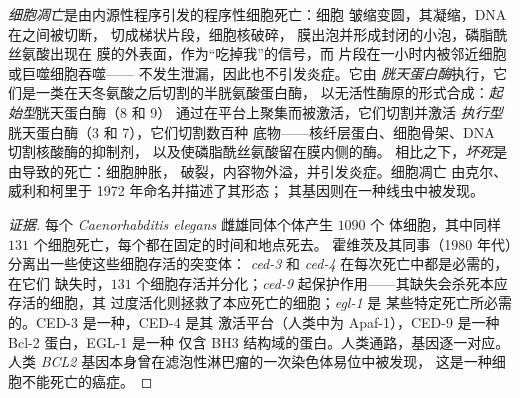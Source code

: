 \begin{definition}[细胞凋亡]\label{def:b3:cell-cycle-apoptosis:apoptosis}
\emph{细胞凋亡}是由内源性程序引发的程序性细胞死亡：细胞
皱缩变圆，其凝缩，DNA 在之间被切断，
切成梯状片段，细胞核破碎，
膜出泡并形成封闭的小泡，磷脂酰丝氨酸出现在
膜的外表面，作为“吃掉我”的信号，而
片段在一小时内被邻近细胞或巨噬细胞吞噬——
不发生泄漏，因此也不引发炎症。它由
\emph{胱天蛋白酶}执行，它们是一类在天冬氨酸之后切割的半胱氨酸蛋白酶，
以无活性酶原的形式合成：\emph{起始型}胱天蛋白酶（8 和 9）
通过在平台上聚集而被激活，它们切割并激活
\emph{执行型}胱天蛋白酶（3 和 7），它们切割数百种
底物——核纤层蛋白、细胞骨架、DNA 切割核酸酶的抑制剂，
以及使磷脂酰丝氨酸留在膜内侧的酶。
相比之下，\emph{坏死}是由导致的死亡：细胞肿胀，
破裂，内容物外溢，并引发炎症。细胞凋亡
由克尔、威利和柯里于 1972 年命名并描述了其形态；
其基因则在一种线虫中被发现。
\end{definition}

\begin{proof}[证据]
每个 \emph{Caenorhabditis elegans} 雌雄同体个体产生 $1090$ 个
体细胞，其中同样 $131$ 个细胞死亡，每个都在固定的时间和地点死去。
霍维茨及其同事（1980 年代）分离出一些使这些细胞存活的突变体：
\emph{ced-3} 和 \emph{ced-4} 在每次死亡中都是必需的，在它们
缺失时，$131$ 个细胞存活并分化；\emph{ced-9}
起保护作用——其缺失会杀死本应存活的细胞，其
过度活化则拯救了本应死亡的细胞；\emph{egl-1} 是
某些特定死亡所必需的。CED-3 是一种，CED-4 是其
激活平台（人类中为 Apaf-1），CED-9 是一种 Bcl-2 蛋白，EGL-1 是一种
仅含 BH3 结构域的蛋白。人类通路，基因逐一对应。
人类 \emph{BCL2} 基因本身曾在滤泡性淋巴瘤的一次染色体易位中被发现，
这是一种细胞不能死亡的癌症。
\end{proof}


